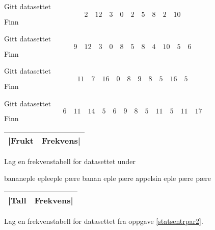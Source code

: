 




Gitt datasettet
\[ 2\quad12\quad 3\quad 0\quad 2\quad 5\quad 8\quad2\quad 10 \]
Finn \os
{}

Gitt datasettet
	\[ 9\quad12\quad 3\quad 0\quad 8\quad 5\quad 8\quad4\quad 10\quad 5 \quad 6 \]
Finn \os
{}

Gitt datasettet
\[ 11\quad7\quad 16\quad 0\quad 8\quad 9\quad 8\quad5\quad 16\quad 5 \]
Finn \os
{}

Gitt datasettet
\[ 6\quad11\quad 14\quad 5\quad 6\quad 9\quad 8\quad5\quad 11\quad 5\quad 11\quad 17 \]
Finn \os
{}

 \vs
\begin{center}
	\begin{tabular}{c|c}
		|Frukt & Frekvens| \\ \hline
	\end{tabular}
\end{center}
Lag en frekvenstabell for datasettet under
\begin{center}
	banan\quad eple \quad eple\quad eple \quad pære \quad banan \quad eple \quad pære \quad appelsin \quad eple \quad pære \quad pære
\end{center}

 \vs
\begin{center}
	\begin{tabular}{c|c}
		|Tall & Frekvens| \\ \hline
	\end{tabular}
\end{center}
Lag en frekvenstabell for datasettet fra oppgave \ref{statsentrpar2}.

 \vs
{}

